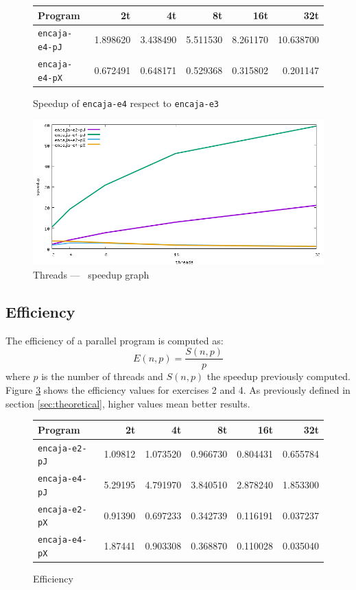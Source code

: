 \documentclass[a4paper]{article}
\begin{document}
\begin{figure}[h]
    \centering
    \begin{tabular}{l r r r r r}
        Program               & 2t       & 4t       & 8t       & 16t      & 32t       \\ \hline
        \texttt{encaja-e4-pJ}	  & 1.898620 & 3.438490 & 5.511530 & 8.261170 & 10.638700 \\
        \texttt{encaja-e4-pX}	  & 0.672491 & 0.648171 & 0.529368 & 0.315802 &  0.201147 \\ \hline
    \end{tabular}
    \caption{Speedup of \texttt{encaja-e4} respect to \texttt{encaja-e3}}
    \label{fig:table-speedupR3}
\end{figure}

\begin{figure}[h]
    \centering
    \includegraphics[width=\textwidth]{../img/speedup}
    \caption{Threads --- \unskip \, speedup graph}
    \label{fig:graph-speedup}
\end{figure}

\subsection{Efficiency}
The efficiency of a parallel program is computed as:
\begin{equation}
E(n,p)=\frac{S(n,p)}{p}
\end{equation}
where $p$ is the number of threads and $S(n,p)$ the speedup previously computed. Figure \ref{fig:table-efficiency} shows the efficiency values for exercises 2 and 4. As previously defined in section \ref{sec:theoretical}, higher values mean better results.

\begin{figure}[h]
	\centering
	\begin{tabular}{l r r r r r}
		Program 			  & 2t  	& 4t 	   & 8t 	  & 16t      & 32t 		\\ \hline
		\texttt{encaja-e2-pJ}	  & 1.09812 & 1.073520 & 0.966730 & 0.804431 & 0.655784	\\
		\texttt{encaja-e4-pJ}	  & 5.29195 & 4.791970 & 3.840510 & 2.878240 & 1.853300	\\
		\texttt{encaja-e2-pX}	  & 0.91390 & 0.697233 & 0.342739 & 0.116191 & 0.037237 \\
		\texttt{encaja-e4-pX}	  & 1.87441 & 0.903308 & 0.368870 & 0.110028 & 0.035040 \\ \hline
	\end{tabular}
	\caption{Efficiency}
	\label{fig:table-efficiency}
\end{figure}
\end{document}
